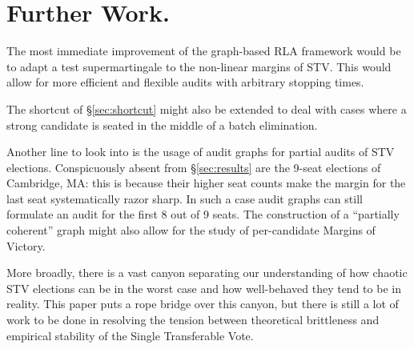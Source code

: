 \section{Further Work.}

The most immediate improvement of the graph-based RLA framework would be to adapt a test supermartingale to the non-linear margins of STV. 
This would allow for more efficient and flexible audits with arbitrary stopping times.

The shortcut of \S\ref{sec:shortcut} might also be extended to deal with cases where a strong candidate is seated in the middle of a batch elimination.

Another line to look into is the usage of audit graphs for partial audits of STV elections. 
Conspicuously absent from \S\ref{sec:results} are the 9-seat elections of Cambridge, MA: this is because their higher seat counts make the margin for the last seat systematically razor sharp.
In such a case audit graphs can still formulate an audit for the first 8 out of 9 seats.
The construction of a ``partially coherent'' graph might also allow for the study of per-candidate Margins of Victory.

More broadly, there is a vast canyon separating our understanding of how chaotic STV elections can be in the worst case and how well-behaved they tend to be in reality.
This paper puts a rope bridge over this canyon, but there is still a lot of work to be done in resolving the tension between theoretical brittleness and empirical stability of the Single Transferable Vote.
